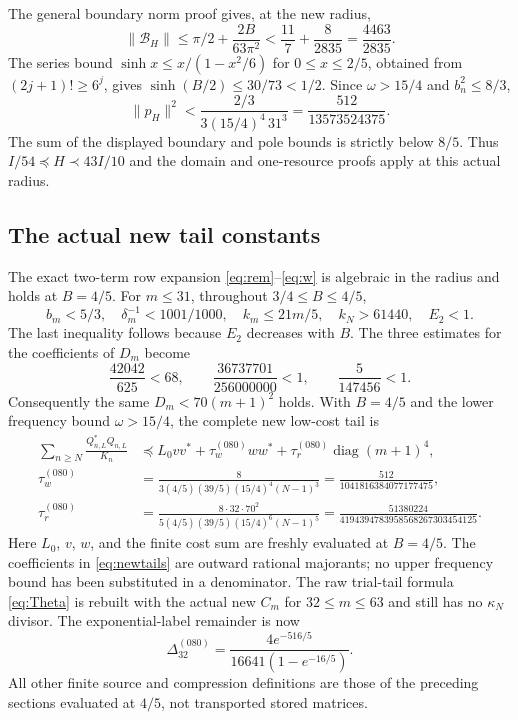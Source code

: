 \documentclass[11pt]{article}
\newcommand{\norm}[1]{\lVert#1\rVert}
\begin{document}
The general boundary norm proof gives, at the new radius,
\[
 \norm{\mathcal B_H}\le\pi/2+\frac{2B}{63\pi^2}
 <\frac{11}7+\frac8{2835}=\frac{4463}{2835}.
\]
The series bound $\sinh x\le x/(1-x^2/6)$ for $0\le x\le2/5$, obtained from $(2j+1)!\ge6^j$, gives $\sinh(B/2)\le30/73<1/2$. Since $\omega>15/4$ and $b_n^2\le8/3$,
\[
 \norm{p_H}^2<\frac{2/3}{3(15/4)^4\,31^3}
 =\frac{512}{13573524375}.
\]
The sum of the displayed boundary and pole bounds is strictly below $8/5$. Thus $I/54\preceq H\prec43I/10$ and the domain and one-resource proofs apply at this actual radius.

\subsection{The actual new tail constants}
The exact two-term row expansion \eqref{eq:rem}--\eqref{eq:w} is algebraic in the radius and holds at $B=4/5$. For $m\le31$, throughout $3/4\le B\le4/5$,
\[
 b_m<5/3,\quad\delta_m^{-1}<1001/1000,\quad k_m\le21m/5,
 \quad k_N>61440,\quad E_2<1.
\]
The last inequality follows because $E_2$ decreases with $B$. The three estimates for the coefficients of $D_m$ become
\[
 \frac{42042}{625}<68,\qquad
 \frac{36737701}{256000000}<1,\qquad
 \frac5{147456}<1.
\]
Consequently the same $D_m<70(m+1)^2$ holds. With $B=4/5$ and the lower frequency bound $\omega>15/4$, the complete new low-cost tail is
\begin{align}
 \sum_{n\ge N}\frac{Q_{n,L}^*Q_{n,L}}{K_n}
 &\preceq L_0vv^*+\tau_w^{(080)}ww^*
       +\tau_r^{(080)}\operatorname{diag}(m+1)^4,\nonumber\\
 \tau_w^{(080)}&=\frac8{3(4/5)(39/5)(15/4)^4(N-1)^3}
 =\frac{512}{1041816384077177475},\nonumber\\
 \tau_r^{(080)}&=\frac{8\cdot32\cdot70^2}{5(4/5)(39/5)(15/4)^6(N-1)^5}
 =\frac{51380224}{4194394783958568267303454125}.\label{eq:newtails}
\end{align}
Here $L_0$, $v$, $w$, and the finite cost sum are freshly evaluated at $B=4/5$. The coefficients in \eqref{eq:newtails} are outward rational majorants; no upper frequency bound has been substituted in a denominator. The raw trial-tail formula \eqref{eq:Theta} is rebuilt with the actual new $C_m$ for $32\le m\le63$ and still has no $\kappa_N$ divisor. The exponential-label remainder is now
\[
 \Delta_{32}^{(080)}=\frac{4e^{-516/5}}{16641(1-e^{-16/5})}.
\]
All other finite source and compression definitions are those of the preceding sections evaluated at $4/5$, not transported stored matrices.
\end{document}
